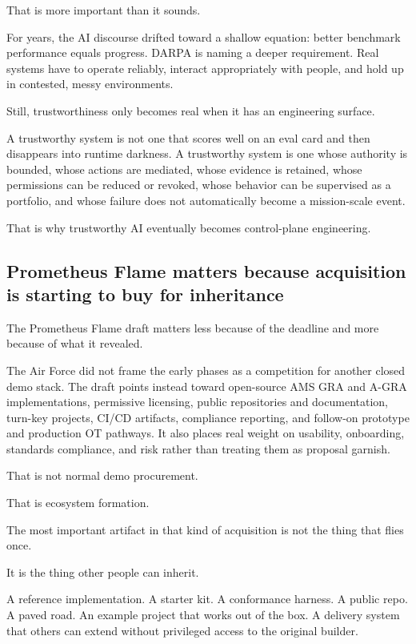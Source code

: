 \documentclass[11pt]{article}
\begin{document}
That is more important than it sounds.

For years, the AI discourse drifted toward a shallow equation: better
benchmark performance equals progress. DARPA is naming a deeper
requirement. Real systems have to operate reliably, interact
appropriately with people, and hold up in contested, messy environments.

Still, trustworthiness only becomes real when it has an engineering
surface.

A trustworthy system is not one that scores well on an eval card and
then disappears into runtime darkness. A trustworthy system is one whose
authority is bounded, whose actions are mediated, whose evidence is
retained, whose permissions can be reduced or revoked, whose behavior
can be supervised as a portfolio, and whose failure does not
automatically become a mission-scale event.

That is why trustworthy AI eventually becomes control-plane engineering.

\hypertarget{prometheus-flame-matters-because-acquisition-is-starting-to-buy-for-inheritance}{%
\subsection{Prometheus Flame matters because acquisition is starting to
buy for
inheritance}\label{prometheus-flame-matters-because-acquisition-is-starting-to-buy-for-inheritance}}

The Prometheus Flame draft matters less because of the deadline and more
because of what it revealed.

The Air Force did not frame the early phases as a competition for
another closed demo stack. The draft points instead toward open-source
AMS GRA and A-GRA implementations, permissive licensing, public
repositories and documentation, turn-key projects, CI/CD artifacts,
compliance reporting, and follow-on prototype and production OT
pathways. It also places real weight on usability, onboarding, standards
compliance, and risk rather than treating them as proposal garnish.

That is not normal demo procurement.

That is ecosystem formation.

The most important artifact in that kind of acquisition is not the thing
that flies once.

It is the thing other people can inherit.

A reference implementation. A starter kit. A conformance harness. A
public repo. A paved road. An example project that works out of the box.
A delivery system that others can extend without privileged access to
the original builder.
\end{document}

